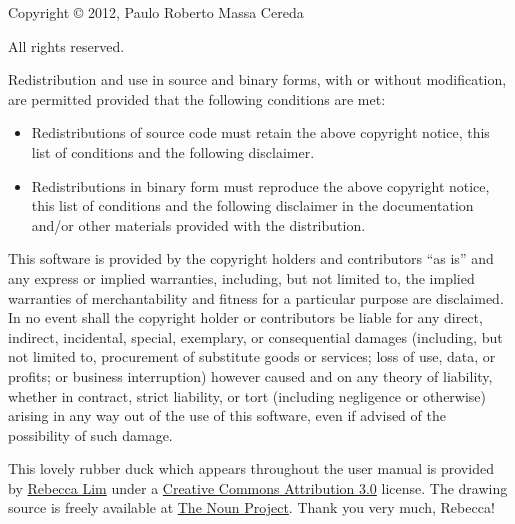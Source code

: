 \documentclass[a4paper,twoside,12pt]{memoir}
\begin{document}
{\setlength{\parindent}{0pt}
\ornamentline

\begin{center}
\scalebox{0.5}{\araralogo}

\slogan
\end{center}

\vspace{0.5em}

Copyright \copyright{} 2012, Paulo Roberto Massa Cereda

All rights reserved.

\vspace{1em}

Redistribution and use in source and binary forms, with or without modification, are permitted provided that the following conditions are met:

\begin{itemize}
\item Redistributions of source code must retain the above copyright notice, this list of conditions and the following disclaimer.
\item Redistributions in binary form must reproduce the above copyright notice, this list of conditions and the following disclaimer in the documentation and/or other materials provided with the distribution.
\end{itemize}

This software is provided by the copyright holders and contributors ``as is'' and any express or implied warranties, including, but not limited to, the implied warranties of merchantability and fitness for a particular purpose are disclaimed. In no event shall the copyright holder or contributors be liable for any direct, indirect, incidental, special, exemplary, or consequential damages (including, but not limited to, procurement of substitute goods or services; loss of use, data, or profits; or business interruption) however caused and on any theory of liability, whether in contract, strict liability, or tort (including negligence or otherwise) arising in any way out of the use of this software, even if advised of the possibility of such damage.

\ornamentline

\begin{center}
\rubberduck
\end{center}

This lovely rubber duck which appears throughout the \arara user manual is provided by \href{http://reblim.com}{Rebecca Lim} under a \href{https://creativecommons.org/licenses/by/3.0/us/}{Creative Commons Attribution 3.0} license. The drawing source is freely available at \href{https://thenounproject.com/term/rubber-duck/25368/}{The Noun Project}. Thank you very much, Rebecca!

}
\end{document}
